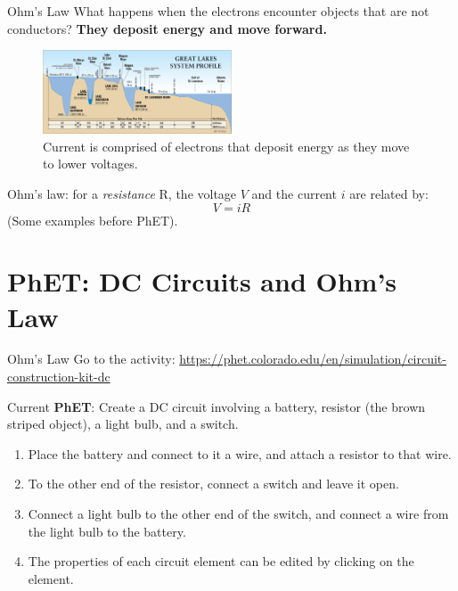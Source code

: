 \documentclass{beamer}
\begin{document}
\begin{frame}{Ohm's Law}
\small
What happens when the electrons encounter objects that are not conductors?  \textbf{They deposit energy and move forward.} \\ \vspace{0.5cm}
\begin{figure}
\centering
\includegraphics[width=0.5\textwidth]{figures/lakes.jpg}
\caption{\label{fig:lakes} Current is comprised of electrons that deposit energy as they move to lower voltages.}
\end{figure}
Ohm's law: for a \textit{resistance} R, the voltage $V$ and the current $i$ are related by:
\begin{equation}
V = i R
\end{equation}
(Some examples before PhET).
\end{frame}

\section{PhET: DC Circuits and Ohm's Law}

\begin{frame}{Ohm's Law}
Go to the activity: \url{https://phet.colorado.edu/en/simulation/circuit-construction-kit-dc}
\end{frame}

\begin{frame}{Current}
\textbf{\alert{PhET}}: Create a DC circuit involving a battery, resistor (the brown striped object), a light bulb, and a switch.
\begin{enumerate}
\item Place the battery and connect to it a wire, and attach a resistor to that wire.
\item To the other end of the resistor, connect a switch and leave it open.
\item Connect a light bulb to the other end of the switch, and connect a wire from the light bulb to the battery.
\item The properties of each circuit element can be edited by clicking on the element.
\end{enumerate}
\end{frame}
\end{document}
